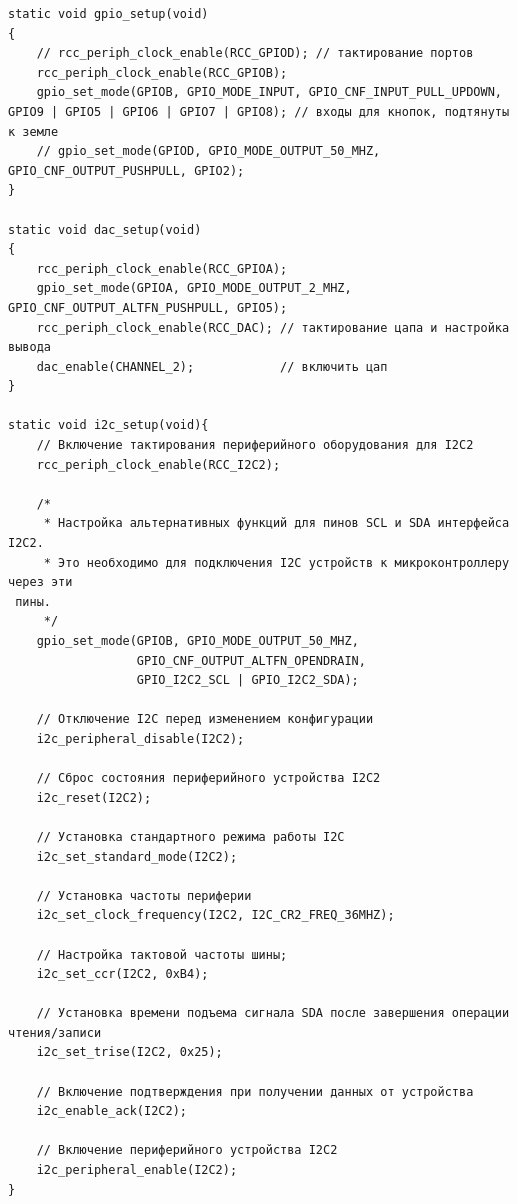 \begin{code}
\begin{verbatim}
static void gpio_setup(void)
{
    // rcc_periph_clock_enable(RCC_GPIOD); // тактирование портов
    rcc_periph_clock_enable(RCC_GPIOB);
    gpio_set_mode(GPIOB, GPIO_MODE_INPUT, GPIO_CNF_INPUT_PULL_UPDOWN, GPIO9 | GPIO5 | GPIO6 | GPIO7 | GPIO8); // входы для кнопок, подтянуты к земле
    // gpio_set_mode(GPIOD, GPIO_MODE_OUTPUT_50_MHZ, GPIO_CNF_OUTPUT_PUSHPULL, GPIO2);
}

static void dac_setup(void)
{
    rcc_periph_clock_enable(RCC_GPIOA);
    gpio_set_mode(GPIOA, GPIO_MODE_OUTPUT_2_MHZ, GPIO_CNF_OUTPUT_ALTFN_PUSHPULL, GPIO5);
    rcc_periph_clock_enable(RCC_DAC); // тактирование цапа и настройка вывода
    dac_enable(CHANNEL_2);            // включить цап
}

static void i2c_setup(void){
    // Включение тактирования периферийного оборудования для I2C2
    rcc_periph_clock_enable(RCC_I2C2);
    
    /*
     * Настройка альтернативных функций для пинов SCL и SDA интерфейса I2C2.
     * Это необходимо для подключения I2C устройств к микроконтроллеру через эти
 пины.
     */
    gpio_set_mode(GPIOB, GPIO_MODE_OUTPUT_50_MHZ,
                  GPIO_CNF_OUTPUT_ALTFN_OPENDRAIN,
                  GPIO_I2C2_SCL | GPIO_I2C2_SDA);
    
    // Отключение I2C перед изменением конфигурации
    i2c_peripheral_disable(I2C2);
    
    // Сброс состояния периферийного устройства I2C2
    i2c_reset(I2C2);
    
    // Установка стандартного режима работы I2C 
    i2c_set_standard_mode(I2C2);
    
    // Установка частоты периферии
    i2c_set_clock_frequency(I2C2, I2C_CR2_FREQ_36MHZ);
    
    // Настройка тактовой частоты шины; 
    i2c_set_ccr(I2C2, 0xB4);
    
    // Установка времени подъема сигнала SDA после завершения операции чтения/записи
    i2c_set_trise(I2C2, 0x25);
    
    // Включение подтверждения при получении данных от устройства
    i2c_enable_ack(I2C2);
    
    // Включение периферийного устройства I2C2
    i2c_peripheral_enable(I2C2);
}
\end{verbatim}
\end{code}
	
